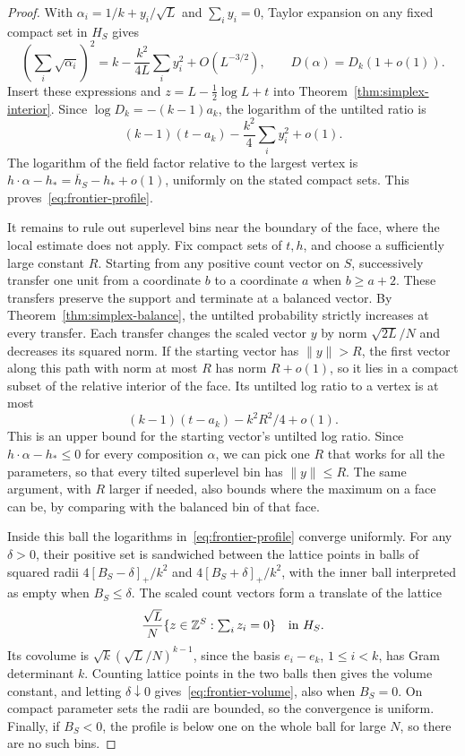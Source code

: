\begin{proof}
With $\alpha_i=1/k+y_i/\sqrt L$ and $\sum_i y_i=0$, Taylor expansion on
any fixed compact set in $H_S$ gives
\[
 \left(\sum_i\sqrt{\alpha_i}\right)^2
 =k-\frac{k^2}{4L}\sum_i y_i^2+O(L^{-3/2}),
 \qquad D(\alpha)=D_k(1+o(1)).
\]
Insert these expressions and $z=L-\tfrac12\log L+t$ into
Theorem~\ref{thm:simplex-interior}. Since
$\log D_k=-(k-1)a_k$, the logarithm of the untilted ratio is
\[
 (k-1)(t-a_k)-\frac{k^2}{4}\sum_i y_i^2+o(1).
\]
The logarithm of the field factor relative to the largest vertex is
$h\cdot\alpha-h_*=\overline h_S-h_*+o(1)$, uniformly on the stated
compact sets. This proves~\eqref{eq:frontier-profile}.

It remains to rule out superlevel bins near the boundary of the face,
where the local estimate does not apply. Fix compact sets of $t,h$, and
choose a sufficiently
large constant $R$. Starting from any positive count vector on $S$,
successively transfer one unit from a coordinate $b$ to a coordinate $a$
when $b\ge a+2$. These transfers preserve the support and terminate at
a balanced vector. By Theorem~\ref{thm:simplex-balance}, the untilted
probability strictly increases at every transfer. Each transfer changes
the scaled vector $y$ by norm $\sqrt{2L}/N$ and decreases its squared
norm. If the starting vector has $\|y\|>R$, the first vector along this
path with norm at most $R$ has norm $R+o(1)$, so it lies in a compact subset
of the relative interior of the face. Its untilted log ratio to a vertex
is at most
\[
 (k-1)(t-a_k)-k^2R^2/4+o(1).
\]
This is an upper bound for the starting vector's untilted log ratio.
Since $h\cdot\alpha-h_*\le0$ for every composition $\alpha$, we can pick
one $R$ that works for all the parameters, so that every tilted superlevel
bin has $\|y\|\le R$. The same argument, with $R$ larger if needed, also
bounds where the maximum on a face can be, by comparing with the balanced
bin of that face.

Inside this ball the logarithms in~\eqref{eq:frontier-profile} converge
uniformly. For any $\delta>0$, their positive set is sandwiched between
the lattice points in balls of squared radii
$4[B_S-\delta]_+/k^2$ and $4[B_S+\delta]_+/k^2$, with the inner ball
interpreted as empty when $B_S\le\delta$. The scaled count vectors form
a translate of the lattice
\[
 \frac{\sqrt L}{N}\{z\in\mathbb Z^S:\textstyle\sum_i z_i=0\}
 \quad\hbox{in }H_S.
\]
Its covolume is $\sqrt{k}(\sqrt L/N)^{k-1}$, since the basis
$e_i-e_k$, $1\le i<k$, has Gram determinant $k$.
Counting lattice points in the two balls then gives the volume constant,
and letting $\delta\downarrow0$ gives~\eqref{eq:frontier-volume}, also
when $B_S=0$. On compact parameter sets the radii are bounded, so the
convergence is uniform. Finally, if $B_S<0$, the profile is below one on
the whole ball for large $N$, so there are no such bins.
\end{proof}

